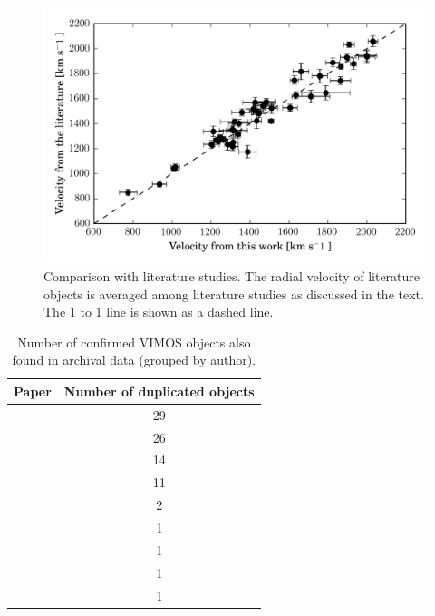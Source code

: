 \documentclass[useAMS,usenatbib]{mn2e}
\begin{document}
\begin{figure}
\centering
\includegraphics[width=\columnwidth]{figures/vel_literature.png} 
\caption{Comparison with literature studies. The radial velocity of literature objects is averaged among literature studies as discussed in the text. The 1 to 1 line is shown as a dashed line. }
\label{fig:vel_comparison}
\end{figure}
\begin{table}
\centering
\label{mathmode}
\begin{tabular}{@{}l c}
\hline
Paper & Number of duplicated objects \\
\hline
\citet{Dirsch04} &         29 \\
\citet{Schuberth10} &       26 \\
\citet{Bergond07}  &     14 \\
\citet{Firth07}   &      11 \\
\citet{Chilingarian11} &     2 \\
\citet{Mieske04} &       1 \\
\citet{Hilker07}  &     1 \\
\citet{Francis12}   &     1 \\
\citet{Drinkwater00}  &    1 \\
\hline
\end{tabular}
\caption{Number of confirmed VIMOS objects also found in archival data (grouped by author). }
\label{tab:authors} 
\end{table}
\end{document}
